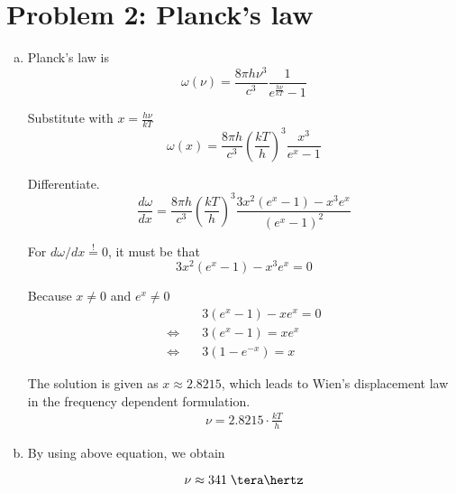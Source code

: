 \documentclass[a4paper,german,12pt,smallheadings]{scrartcl}
\begin{document}
\section*{Problem 2: Planck's law}
\begin{enumerate}[a)]
  \item
    Planck's law is
    \begin{equation*}
      \omega(\nu) = \frac{8 \pi h \nu^3}{c^3} \frac{1}{e^\frac{h \nu}{kT} - 1}
    \end{equation*}

    Substitute with $x = \frac{h \nu}{kT}$
    \begin{equation*}
      \omega(x) = \frac{8 \pi h}{c^3} \left(\frac{kT}{h}\right)^3 \frac{x^3}{e^x - 1}
    \end{equation*}

    Differentiate.
    \begin{equation*}
      \frac{d \omega}{dx} = \frac{8 \pi h}{c^3} \left(\frac{kT}{h}\right)^3 \frac{3x^2(e^x-1) - x^3e^x}{(e^x - 1)^2}
    \end{equation*}

    For $d \omega / dx \overset{!}{=} 0$, it must be that
    \begin{equation*}
      3x^2(e^x-1) - x^3e^x = 0
    \end{equation*}

    Because $x \neq 0$ and $e^x \neq 0$
    \begin{align*}
      &\quad 3(e^x-1) - xe^x = 0 \\
      \Leftrightarrow&\quad 3(e^x-1) = xe^x \\
      \Leftrightarrow&\quad 3(1 - e^{-x}) = x
    \end{align*}

    The solution is given as $x \approx 2.8215$, which leads to Wien's
    displacement law in the frequency dependent formulation.
    \begin{align*}
      \nu = 2.8215 \cdot \frac{kT}{h}
    \end{align*}

  \item
    By using above equation, we obtain

    \begin{equation*}
      \nu \approx 341 \; \tera\hertz
    \end{equation*}

\end{enumerate}
\end{document}
